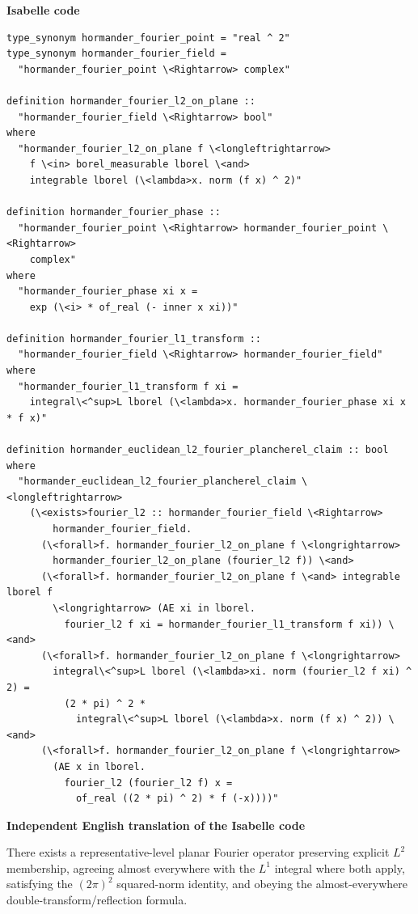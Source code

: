 \documentclass[10pt,oneside]{article}
\newcommand{\reviewlabel}[1]{\par\smallskip\noindent\textsf{\bfseries #1}\par\smallskip}
\begin{document}
\reviewlabel{Isabelle code}
\begin{lstlisting}
type_synonym hormander_fourier_point = "real ^ 2"
type_synonym hormander_fourier_field =
  "hormander_fourier_point \<Rightarrow> complex"

definition hormander_fourier_l2_on_plane ::
  "hormander_fourier_field \<Rightarrow> bool"
where
  "hormander_fourier_l2_on_plane f \<longleftrightarrow>
    f \<in> borel_measurable lborel \<and>
    integrable lborel (\<lambda>x. norm (f x) ^ 2)"

definition hormander_fourier_phase ::
  "hormander_fourier_point \<Rightarrow> hormander_fourier_point \<Rightarrow>
    complex"
where
  "hormander_fourier_phase xi x =
    exp (\<i> * of_real (- inner x xi))"

definition hormander_fourier_l1_transform ::
  "hormander_fourier_field \<Rightarrow> hormander_fourier_field"
where
  "hormander_fourier_l1_transform f xi =
    integral\<^sup>L lborel (\<lambda>x. hormander_fourier_phase xi x * f x)"

definition hormander_euclidean_l2_fourier_plancherel_claim :: bool
where
  "hormander_euclidean_l2_fourier_plancherel_claim \<longleftrightarrow>
    (\<exists>fourier_l2 :: hormander_fourier_field \<Rightarrow>
        hormander_fourier_field.
      (\<forall>f. hormander_fourier_l2_on_plane f \<longrightarrow>
        hormander_fourier_l2_on_plane (fourier_l2 f)) \<and>
      (\<forall>f. hormander_fourier_l2_on_plane f \<and> integrable lborel f
        \<longrightarrow> (AE xi in lborel.
          fourier_l2 f xi = hormander_fourier_l1_transform f xi)) \<and>
      (\<forall>f. hormander_fourier_l2_on_plane f \<longrightarrow>
        integral\<^sup>L lborel (\<lambda>xi. norm (fourier_l2 f xi) ^ 2) =
          (2 * pi) ^ 2 *
            integral\<^sup>L lborel (\<lambda>x. norm (f x) ^ 2)) \<and>
      (\<forall>f. hormander_fourier_l2_on_plane f \<longrightarrow>
        (AE x in lborel.
          fourier_l2 (fourier_l2 f) x =
            of_real ((2 * pi) ^ 2) * f (-x))))"
\end{lstlisting}

\reviewlabel{Independent English translation of the Isabelle code}
There exists a representative-level planar Fourier operator preserving explicit $L^2$ membership, agreeing almost everywhere with the $L^1$ integral where both apply, satisfying the $(2\pi)^2$ squared-norm identity, and obeying the almost-everywhere double-transform/reflection formula.
\end{document}
